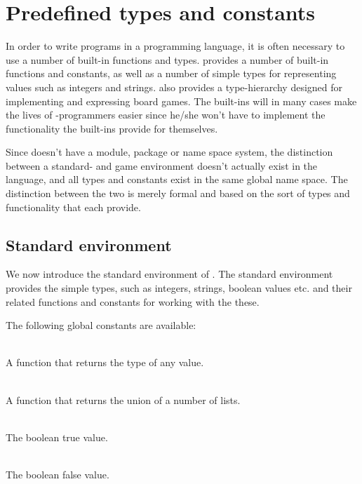 \section{Predefined types and constants}
\label{sec:predefined}

In order to write programs in a programming language, it is often necessary to use a number of built-in
functions and types. \productname{} provides a number of built-in functions and constants, as well as 
a number of simple types for representing values such as integers and strings. \productname{} also provides
a type-hierarchy designed for implementing and expressing board games. The built-ins will in many cases make
the lives of \productname{}-programmers easier since he/she won't have to implement the functionality the built-ins
provide for themselves. 

Since \productname{} doesn't have a module, package or name space system, the distinction between a standard-
and game environment doesn't actually exist in the language, and all types and constants exist in the same
global name space. The distinction between the two is merely formal and based on the sort of types and functionality
that each provide.
 
\subsection{Standard environment}
\label{sec:standardenvironment}

We now introduce the standard environment of \productname{}. The standard environment provides the simple types, such as
integers, strings, boolean values etc. and their related functions and constants for working with the these.

The following global constants are available:

\begin{dlist}
  \item {}\\
    A function that returns the type of any value.
  \item {}\\
    A function that returns the union of a number of lists.
  \item {}\\
    The boolean true value.
  \item {}\\
    The boolean false value.
\end{dlist}

